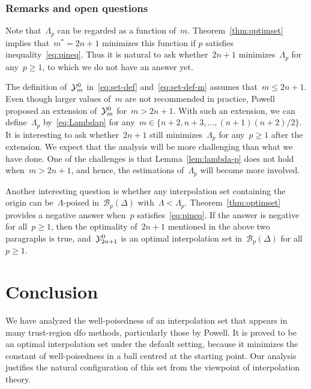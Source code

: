 \documentclass{article}
\numberwithin{equation}{section}
\theoremstyle{definition}
\theoremstyle{plain}
\theoremstyle{remark}
\newcommand*{\solvername}[1]{\textsc{#1}\xspace}
\newcommand*{\xpt}[1][]{\mathcal{Y}\ifblank{#1}{}{^{#1}}}
\begin{document}
\subsubsection{Remarks and open questions}

Note that~$\Lambda_p$ can be regarded as a function of~$m$. Theorem~\ref{thm:optimset} implies that~$m^\ast = 2n+1$ minimizes this function if $p$ satisfies inequality~\eqref{eq:pineq}.
Thus it is natural to ask whether~$2n+1$ minimizes~$\Lambda_p$ for any~$p \ge 1$, to which we do not have an answer yet.

The definition of~$\xpt[0]_m$ in~\eqref{eq:set-def} and~\eqref{eq:set-def-m} assumes that~$m \le 2n + 1$.
Even though larger values of~$m$ are not recommended in practice, Powell~\cite{Powell_2006} proposed
an extension of~$\xpt[0]_m$ for~$m>2n+1$.
With such an extension, we can define~$\Lambda_p$ by~\eqref{eq:Lambdap} for any~$m \in \{n+2, n+3, \dots, (n+1)(n+2)/2\}$.
It is interesting to ask whether~$2n + 1$ still minimizes~$\Lambda_p$ for any~$p \ge 1$ after the extension. %
We expect that the analysis will be more challenging than what we have done.
One of the challenges is that Lemma~\ref{lem:lambda-p} does not hold when~$m > 2n + 1$, and hence, the estimations of~$\Lambda_p$ will become more involved.

Another interesting question is whether any interpolation set containing the origin can be~\mbox{$\Lambda$-poised} in~$\mathcal{B}_p(\Delta)$ with~$\Lambda < \Lambda_p$.
Theorem~\ref{thm:optimset} provides a negative answer when~$p$ satisfies~\eqref{eq:pineq}.
If the answer is negative for all~$p\ge 1$, then the optimality of~$2n+1$ mentioned in the above two
paragraphs is true, and~$\xpt[0]_{2n+1}$ is an optimal interpolation set in~$\mathcal{B}_p(\Delta)$ for all~$p\ge 1$.



\section{Conclusion}
\label{sec:conclusion}

We have analyzed the well-poisedness of an interpolation set that appears in many trust-region \gls{dfo} methods, particularly those by Powell.
It is proved to be an optimal interpolation set under the default setting, because it minimizes the constant of well-poisedness in a ball centred at the starting point.
Our analysis justifies the natural configuration of this set from the viewpoint of interpolation theory.
\end{document}
